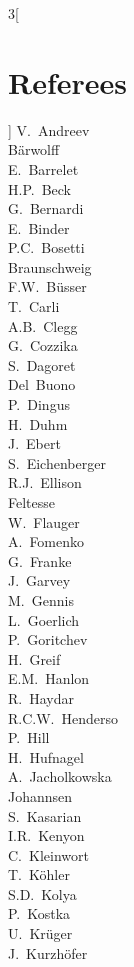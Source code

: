 \documentclass{llncs}
\begin{document}
	\begin{multicols}{3}[\section*{Referees}]
		V.~Andreev\\
		B\"arwolff\\
		E.~Barrelet\\
		H.P.~Beck\\
		G.~Bernardi\\
		E.~Binder\\
		P.C.~Bosetti\\
		Braunschweig\\
		F.W.~B\"usser\\
		T.~Carli\\
		A.B.~Clegg\\
		G.~Cozzika\\
		S.~Dagoret\\
		Del~Buono\\
		P.~Dingus\\
		H.~Duhm\\
		J.~Ebert\\
		S.~Eichenberger\\
		R.J.~Ellison\\
		Feltesse\\
		W.~Flauger\\
		A.~Fomenko\\
		G.~Franke\\
		J.~Garvey\\
		M.~Gennis\\
		L.~Goerlich\\
		P.~Goritchev\\
		H.~Greif\\
		E.M.~Hanlon\\
		R.~Haydar\\
		R.C.W.~Henderso\\
		P.~Hill\\
		H.~Hufnagel\\
		A.~Jacholkowska\\
		Johannsen\\
		S.~Kasarian\\
		I.R.~Kenyon\\
		C.~Kleinwort\\
		T.~K\"ohler\\
		S.D.~Kolya\\
		P.~Kostka\\
		U.~Kr\"uger\\
		J.~Kurzh\"ofer\\

\end{multicols}
\end{document}

